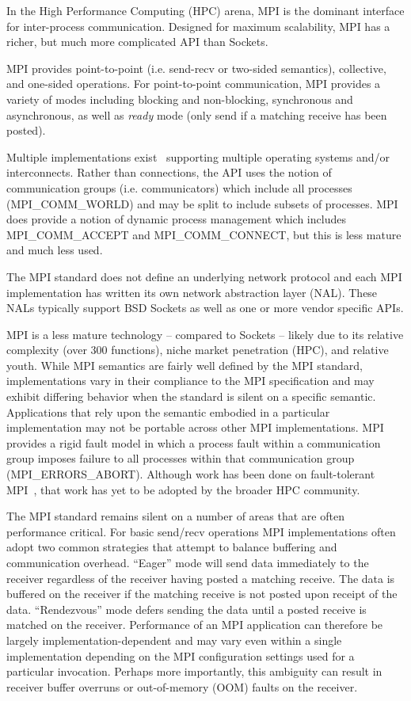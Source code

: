 In the High Performance Computing (HPC) arena, MPI is the dominant
interface for inter-process communication. Designed for maximum scalability, MPI has a
richer, but much more complicated API than Sockets.

MPI provides point-to-point (i.e. send-recv or two-sided semantics), collective, and
one-sided operations. For point-to-point communication, MPI provides a variety of modes
including blocking and non-blocking, synchronous and asynchronous, as well as \emph{ready}
mode (only send if a matching receive has been posted).

Multiple implementations exist~\cite{ompi_04_pvmmpi_overview, Gropp:1996:HPI, Liu:2003:RDMA}
supporting multiple operating systems and/or interconnects.  Rather than connections,
the API uses the notion of communication groups (i.e.  communicators) which include all
processes ({\sf MPI\_COMM\_WORLD}) and may be split to include subsets of processes. MPI does
provide a notion of dynamic process management which includes {\sf MPI\_COMM\_ACCEPT} and
{\sf MPI\_COMM\_CONNECT}, but this is less mature and much less used.

The MPI standard does not define an underlying network protocol and each MPI
implementation has written its own network abstraction layer (NAL). These NALs typically
support BSD Sockets as well as one or more vendor specific APIs.

MPI is a less mature technology -- compared to Sockets -- likely due to its
relative complexity (over 300 functions), niche market penetration
(HPC), and relative youth. While MPI semantics are fairly well defined
by the MPI standard, implementations vary in their compliance to the
MPI specification and may exhibit differing behavior when the standard is
silent on a specific semantic. Applications that rely upon the
semantic embodied in a particular implementation may not be portable
across other MPI implementations. MPI provides a rigid fault model in
which a process fault within a communication group imposes failure to
all processes within that communication group
({\sf MPI\_ERRORS\_ABORT}). Although work has been done on fault-tolerant
MPI~\cite{fagg04:_fault_toler_commun_librar_applic_high_perof, mpi-ft},
that work has yet to be adopted by the broader HPC community. 

The MPI standard remains silent on a number of areas that are often
performance critical. For basic send/recv operations MPI
implementations often adopt two common strategies that attempt to
balance buffering and communication overhead. ``Eager'' mode will send
data immediately to the receiver regardless of the receiver having
posted a matching receive. The data is buffered on the receiver if the
matching receive is not posted upon receipt of the
data. ``Rendezvous'' mode defers sending the data until a posted
receive is matched on the receiver. Performance of an MPI application
can therefore be largely implementation-dependent and may vary even
within a single implementation depending on the MPI configuration
settings used for a particular invocation. Perhaps more importantly,
this ambiguity can result in receiver buffer overruns or out-of-memory
(OOM) faults on the receiver.


